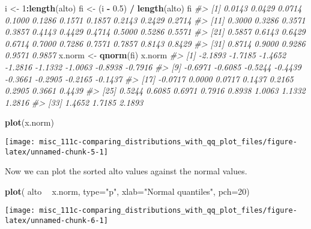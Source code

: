 \documentclass[]{book}
\newenvironment{Shaded}{\begin{snugshade}}{\end{snugshade}}
\newcommand{\CommentTok}[1]{\textcolor[rgb]{0.56,0.35,0.01}{\textit{#1}}}
\newcommand{\DataTypeTok}[1]{\textcolor[rgb]{0.13,0.29,0.53}{#1}}
\newcommand{\DecValTok}[1]{\textcolor[rgb]{0.00,0.00,0.81}{#1}}
\newcommand{\FloatTok}[1]{\textcolor[rgb]{0.00,0.00,0.81}{#1}}
\newcommand{\KeywordTok}[1]{\textcolor[rgb]{0.13,0.29,0.53}{\textbf{#1}}}
\newcommand{\NormalTok}[1]{#1}
\newcommand{\OperatorTok}[1]{\textcolor[rgb]{0.81,0.36,0.00}{\textbf{#1}}}
\newcommand{\StringTok}[1]{\textcolor[rgb]{0.31,0.60,0.02}{#1}}
\begin{document}
\begin{Shaded}
\begin{Highlighting}[]
\NormalTok{i <-}\StringTok{ }\DecValTok{1}\OperatorTok{:}\KeywordTok{length}\NormalTok{(alto)}
\NormalTok{fi <-}\StringTok{ }\NormalTok{(i }\OperatorTok{-}\StringTok{ }\FloatTok{0.5}\NormalTok{) }\OperatorTok{/}\StringTok{ }\KeywordTok{length}\NormalTok{(alto)}
\NormalTok{fi}
\CommentTok{#>  [1] 0.0143 0.0429 0.0714 0.1000 0.1286 0.1571 0.1857 0.2143 0.2429 0.2714}
\CommentTok{#> [11] 0.3000 0.3286 0.3571 0.3857 0.4143 0.4429 0.4714 0.5000 0.5286 0.5571}
\CommentTok{#> [21] 0.5857 0.6143 0.6429 0.6714 0.7000 0.7286 0.7571 0.7857 0.8143 0.8429}
\CommentTok{#> [31] 0.8714 0.9000 0.9286 0.9571 0.9857}
\NormalTok{x.norm <-}\StringTok{ }\KeywordTok{qnorm}\NormalTok{(fi)}
\NormalTok{x.norm}
\CommentTok{#>  [1] -2.1893 -1.7185 -1.4652 -1.2816 -1.1332 -1.0063 -0.8938 -0.7916}
\CommentTok{#>  [9] -0.6971 -0.6085 -0.5244 -0.4439 -0.3661 -0.2905 -0.2165 -0.1437}
\CommentTok{#> [17] -0.0717  0.0000  0.0717  0.1437  0.2165  0.2905  0.3661  0.4439}
\CommentTok{#> [25]  0.5244  0.6085  0.6971  0.7916  0.8938  1.0063  1.1332  1.2816}
\CommentTok{#> [33]  1.4652  1.7185  2.1893}
\end{Highlighting}
\end{Shaded}

\begin{Shaded}
\begin{Highlighting}[]
\KeywordTok{plot}\NormalTok{(x.norm)}
\end{Highlighting}
\end{Shaded}

\begin{center}\texttt{[image: misc\_111c-comparing\_distributions\_with\_qq\_plot\_files/figure-latex/unnamed-chunk-5-1]} \end{center}

Now we can plot the sorted alto values against the normal values.

\begin{Shaded}
\begin{Highlighting}[]
\KeywordTok{plot}\NormalTok{( alto }\OperatorTok{~}\StringTok{ }\NormalTok{x.norm, }\DataTypeTok{type=}\StringTok{"p"}\NormalTok{, }\DataTypeTok{xlab=}\StringTok{"Normal quantiles"}\NormalTok{, }\DataTypeTok{pch=}\DecValTok{20}\NormalTok{)}
\end{Highlighting}
\end{Shaded}

\begin{center}\texttt{[image: misc\_111c-comparing\_distributions\_with\_qq\_plot\_files/figure-latex/unnamed-chunk-6-1]} \end{center}
\end{document}
